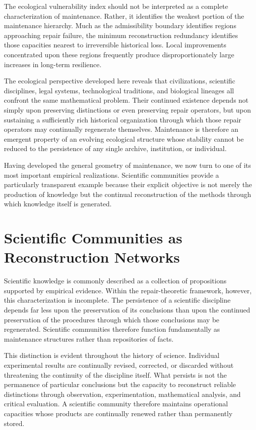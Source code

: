 \documentclass[12pt,oneside]{article}
\theoremstyle{plain}
\theoremstyle{definition}
\theoremstyle{remark}
\theoremstyle{plain}
\begin{document}
The ecological vulnerability index should not be interpreted as a complete characterization of
maintenance. Rather, it identifies the weakest portion of the maintenance hierarchy. Much as the
admissibility boundary identifies regions approaching repair failure, the minimum reconstruction
redundancy identifies those capacities nearest to irreversible historical loss. Local improvements
concentrated upon these regions frequently produce disproportionately large increases in long-term
resilience.

The ecological perspective developed here reveals that civilizations, scientific disciplines, legal
systems, technological traditions, and biological lineages all confront the same mathematical
problem. Their continued existence depends not simply upon preserving distinctions or even
preserving repair operators, but upon sustaining a sufficiently rich historical organization through
which those repair operators may continually regenerate themselves. Maintenance is therefore an
emergent property of an evolving ecological structure whose stability cannot be reduced to the
persistence of any single archive, institution, or individual.

Having developed the general geometry of maintenance, we now turn to one of its most important
empirical realizations. Scientific communities provide a particularly transparent example because
their explicit objective is not merely the production of knowledge but the continual reconstruction
of the methods through which knowledge itself is generated.

\section{Scientific Communities as Reconstruction Networks}

Scientific knowledge is commonly described as a collection of propositions supported by empirical
evidence. Within the repair-theoretic framework, however, this characterization is incomplete. The
persistence of a scientific discipline depends far less upon the preservation of its conclusions
than upon the continued preservation of the procedures through which those conclusions may be
regenerated. Scientific communities therefore function fundamentally as maintenance structures
rather than repositories of facts.

This distinction is evident throughout the history of science. Individual experimental results are
continually revised, corrected, or discarded without threatening the continuity of the discipline
itself. What persists is not the permanence of particular conclusions but the capacity to
reconstruct reliable distinctions through observation, experimentation, mathematical analysis, and
critical evaluation. A scientific community therefore maintains operational capacities whose
products are continually renewed rather than permanently stored.
\end{document}
